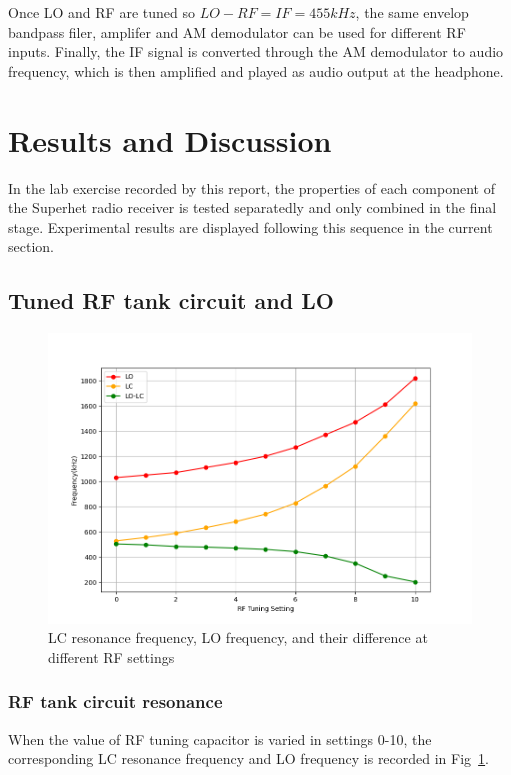 \documentclass[a4paper,12pt]{article}
\begin{document}
Once LO and RF are tuned so $LO-RF=IF=455kHz$, the same envelop bandpass filer, amplifer and AM demodulator can be used for different RF inputs. 
Finally, the IF signal is converted through the AM demodulator to audio frequency, which is then amplified and played as audio output at the headphone.


\section{Results and Discussion}
In the lab exercise recorded by this report, the properties of each component of the Superhet radio receiver is tested separatedly and only combined in the final stage. Experimental results are displayed following this sequence in the current section.

\subsection{Tuned RF tank circuit and LO}
\vspace{-0.5em}
\begin{figure}[h]
    \centering
    \includegraphics[width=\textwidth]{lo_tracking}
    \caption{LC resonance frequency, LO frequency, and their difference at different RF settings}
    \label{fig:rf_lo}
\end{figure}

\vspace{-1.5em}
\subsubsection{RF tank circuit resonance}
When the value of RF tuning capacitor is varied in settings 0-10, the corresponding LC resonance frequency and LO frequency is recorded in Fig~\ref{fig:rf_lo}. 
\end{document}
